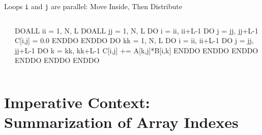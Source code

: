 \documentclass{beamer}
\newcommand{\emp}[1]{\textcolor{DikuRed}{ #1}}
\newcommand{\emphh}[1]{\textcolor{CosGreen}{ #1}}
\begin{document}
\begin{frame}[fragile,t]
\begin{block}{Loops {\tt i} and {\tt j} are parallel: Move Inside, Then Distribute}
\begin{columns}
\begin{colorcode}[fontsize=\scriptsize]
\end{colorcode}
\vspace{-2ex}
\begin{colorcode}[fontsize=\scriptsize]
\emphh{DOALL} ii = 1, N, L  
  \emphh{DOALL} jj = 1, N, L
    \emp{DO i = ii, ii+L-1} 
      \emp{DO j = jj, jj+L-1}  
        C[i,j] = 0.0
    ENDDO ENDDO
    DO kk = 1, N, L
      \emp{DO i = ii, ii+L-1} 
        \emp{DO j = jj, jj+L-1}  
          \emp{DO k = kk, kk+L-1}
            C[i,j] += A[k,j]*B[i,k]
ENDDO ENDDO ENDDO ENDDO ENDDO ENDDO
\end{colorcode}
\end{columns}
\end{block}


\end{frame}


\section{Imperative Context: Summarization of Array Indexes}
\begin{frame}[fragile]
	\tableofcontents[currentsection]
\end{frame}
\end{document}
